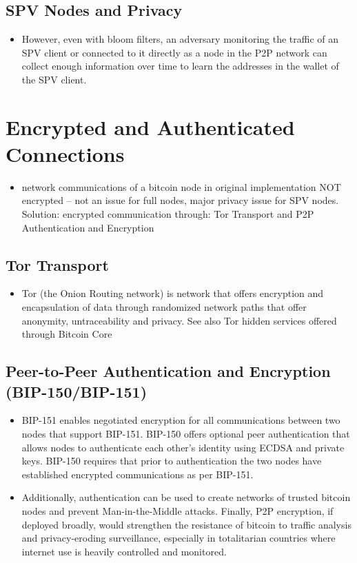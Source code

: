\documentclass[english, 11pt]{article}
\begin{document}
\subsection{SPV Nodes and Privacy}
\begin{itemize}
    \item However, even with bloom filters, an adversary monitoring the traffic of an SPV client or connected to it directly as a node in the P2P network can collect enough information over time to learn the addresses in the wallet of the SPV client.
\end{itemize}

\section{Encrypted and Authenticated Connections}
\begin{itemize}
    \item network communications of a bitcoin node in original implementation NOT encrypted -- not an issue for full nodes, major privacy issue for SPV nodes. Solution: encrypted communication through: Tor Transport and P2P Authentication and Encryption
\end{itemize}

\subsection{Tor Transport}
\begin{itemize}
    \item Tor (the Onion Routing network) is network that offers encryption and encapsulation of data through randomized network paths that offer anonymity, untraceability and privacy. See also Tor hidden services offered through Bitcoin Core
\end{itemize}

\subsection{Peer-to-Peer Authentication and Encryption (BIP-150/BIP-151)}
\begin{itemize}
    \item BIP-151 enables negotiated encryption for all communications between two nodes that support BIP-151. BIP-150 offers optional peer authentication that allows nodes to authenticate each other’s identity using ECDSA and private keys. BIP-150 requires that prior to authentication the two nodes have established encrypted communications as per BIP-151.
    \item Additionally, authentication can be used to create networks of trusted bitcoin nodes and prevent Man-in-the-Middle attacks. Finally, P2P encryption, if deployed broadly, would strengthen the resistance of bitcoin to traffic analysis and privacy-eroding surveillance, especially in totalitarian countries where internet use is heavily controlled and monitored.
\end{itemize}
\end{document}
